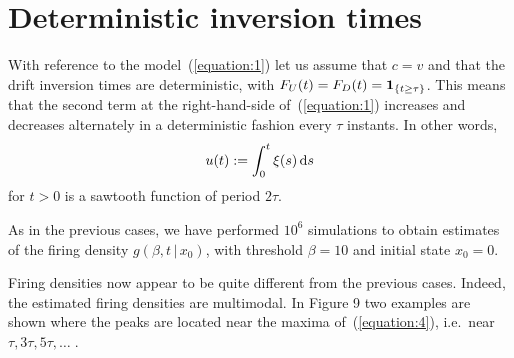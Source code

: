 \section{Deterministic inversion times}\label{section:6}
With reference to the model~(\ref{equation:1}) let us assume that $c=v$ and that the 
drift inversion times are deterministic, with $F_U(t)=F_D(t)={\bf 1}_{\{t\geq \tau\}}$. 
This means that the second term at the right-hand-side of~(\ref{equation:1}) 
increases and decreases alternately in a deterministic fashion every $\tau$ 
instants. In other words, 
\begin{equation}
 u(t):=\int_0^t\xi(s)\,{\rm d}s
 \label{equation:4}
\end{equation}
for $t>0$ is a sawtooth function of period $2\tau$. 
\par
As in the previous cases, we have performed $10^6$ simulations to obtain 
estimates of the firing density $g(\beta,t\,|\,x_0)$, with threshold 
$\beta=10$ and initial state $x_0=0$. 
\par
Firing densities now appear to be quite different from the previous cases. Indeed, 
the estimated firing densities are multimodal. In Figure 9 two examples are shown 
where the peaks are located near the maxima of~(\ref{equation:4}), i.e.\ 
near $\tau,3\tau,5\tau,\ldots\;$. 
\begin{figure} 
\end{figure}
%
